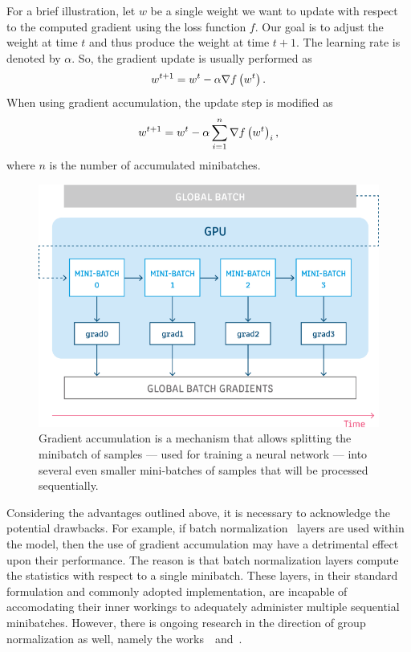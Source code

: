 For a brief illustration, let $w$ be a single weight we want to update with respect to the computed gradient using the loss function $f$. Our goal is to adjust the weight at time $t$ and thus produce the weight at time $t + 1$. The learning rate is denoted by $\alpha$. So, the gradient update is usually performed as
\begin{equation}
    w^{t + 1} = w^t - \alpha \nabla {f} \left( w^t \right).
\end{equation}
When using gradient accumulation, the update step is modified as
\begin{equation}
    w^{t + 1} = w^t - \alpha \sum_{i = 1}^{n} \nabla {f} \left( w^t \right)_i,
\end{equation}
where $n$ is the number of accumulated minibatches.

\begin{figure}[!t]
    \centering
    \includegraphics[width=0.6\linewidth]{figures/siamese_tracking/gradient_accumulation.png}
    \caption[Gradient accumulation]{Gradient accumulation is a mechanism that allows splitting the minibatch of samples — used for training a neural network — into several even smaller mini-batches of samples that will be processed sequentially. }
    \label{fig:GradientAccumulation}
\end{figure}

Considering the advantages outlined above, it is necessary to acknowledge the potential drawbacks. For example, if batch normalization~\cite{ioffe2015batchnorm} layers are used within the model, then the use of gradient accumulation may have a detrimental effect upon their performance. The reason is that batch normalization layers compute the statistics with respect to a single minibatch. These layers, in their standard formulation and commonly adopted implementation, are incapable of accomodating their inner workings to adequately administer multiple sequential minibatches. However, there is ongoing research in the direction of group normalization as well, namely the works~\cite{wu2018groupnorm}~and~\cite{zhou2020batchgroupnorm}.

